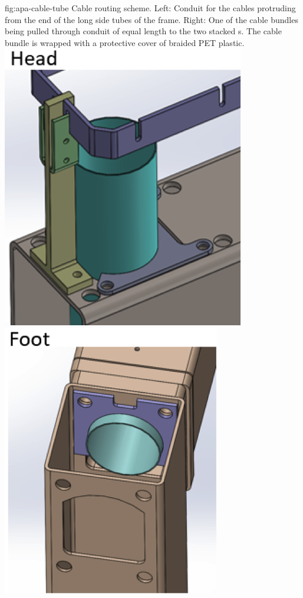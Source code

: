 \begin{dunefigure}{fig:apa-cable-tube}
{Cable routing scheme. Left: Conduit for the  cables protruding from the end of the long side tubes of the  frame.  Right: One of the  cable bundles being pulled through conduit of equal length to the two stacked s.  The cable bundle is wrapped with a protective cover of braided PET plastic.  }
\includegraphics[height=0.3\textheight,trim=5mm 0mm 0mm 7mm,clip]{graphics/sp-apa-cable-tube-head.png} \quad
\includegraphics[height=0.3\textheight,trim=5mm 0mm 0mm 7mm,clip]{graphics/sp-apa-cable-tube-foot.png} \quad

\end{dunefigure}
